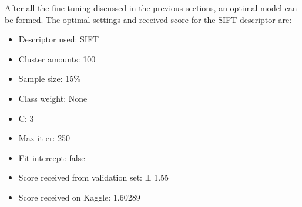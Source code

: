 After all the fine-tuning discussed in the previous sections, an optimal model can be formed.
The optimal settings and received score for the SIFT descriptor are:
\begin{itemize}
    \item Descriptor used: SIFT
    \item Cluster amounts: 100
    \item Sample size: 15\%
    \item Class weight: None
    \item C: 3
    \item Max it-er: 250
    \item Fit intercept: false
    \item Score received from validation set: ± 1.55
    \item Score received on Kaggle: 1.60289
\end{itemize}



